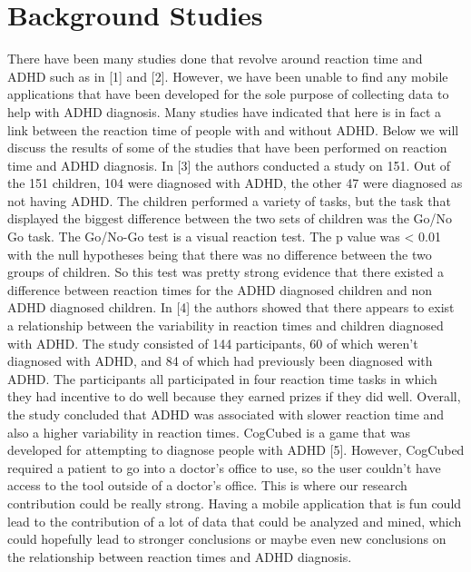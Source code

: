 \documentclass[a4wide]{article}
\begin{document}
\section{Background Studies}
\- There have been many studies done that revolve around reaction time and ADHD such as in [1] and [2]. However, we have been unable to find any mobile applications that have been developed for the sole purpose of collecting data to help with ADHD diagnosis. Many studies have indicated that here is in fact a link between the reaction time of people with and without ADHD. Below we will discuss the results of some of the studies that have been performed on reaction time and ADHD diagnosis.
\newline
\newline
\- In [3] the authors conducted a study on 151. Out of the 151 children, 104 were diagnosed with ADHD, the other 47 were diagnosed as not having ADHD. The children performed a variety of tasks, but the task that displayed the biggest difference between the two sets of children was the Go/No Go task. The Go/No-Go test is a visual reaction test. The p value was < 0.01 with the null hypotheses being that there was no difference between the two groups of children. So this test was pretty strong evidence that there existed a difference between reaction times for the ADHD diagnosed children and non ADHD diagnosed children.
\newline
\newline
\- In [4] the authors showed that there appears to exist a relationship between the variability in reaction times and children diagnosed with ADHD. The study consisted of 144 participants, 60 of which weren't diagnosed with ADHD, and 84 of which had previously been diagnosed with ADHD. The participants all participated in four reaction time tasks in which they had incentive to do well because they earned prizes if they did well. Overall, the study concluded that ADHD was associated with slower reaction time and also a higher variability in reaction times.
\newline
\newline
\- CogCubed is a game that was developed for attempting to diagnose people with ADHD [5]. However, CogCubed required a patient to go into a doctor's office to use, so the user couldn't have access to the tool outside of a doctor's office. This is where our research contribution could be really strong. Having a mobile application that is fun could lead to the contribution of a lot of data that could be analyzed and mined, which could hopefully lead to stronger conclusions or maybe even new conclusions on the relationship between reaction times and ADHD diagnosis.
\end{document}
